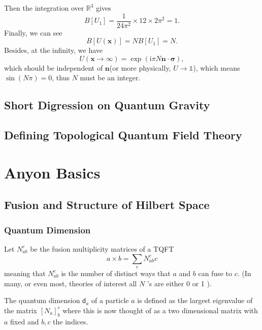 \documentclass{book}
\begin{document}
Then the integration over $\mathbb{R}^{3}$ gives
\begin{equation*}
B[ U_{1}] =\frac{1}{24\pi ^{2}} \times 12\times 2\pi ^{2} =1.
\end{equation*}
Finally, we can see
\begin{equation*}
B[ U(\boldsymbol{x})] =NB[ U_{1}] =N.
\end{equation*}
Besides, at the infinity, we have
\begin{equation*}
U(\boldsymbol{x}\rightarrow \infty )=\exp(\mathrm{i} \pi N\boldsymbol{n} \cdot \boldsymbol{\sigma }) ,
\end{equation*}
which should be independent of $\boldsymbol{n}$(or more physically, $U\rightarrow \mathds{1}$), which means $\sin( N\pi ) =0$, thus $N$ must be an integer. 

\chapter{Short Digression on Quantum Gravity}

\chapter{Defining Topological Quantum Field Theory}

\part{Anyon Basics}

\chapter{Fusion and Structure of Hilbert Space}

\section{Quantum Dimension}
Let $N_{ab}^{c}$ be the fusion multiplicity matrices of a TQFT
\begin{equation*}
a\times b=\sum _{c} N_{ab}^{c} c
\end{equation*}
meaning that $N_{ab}^{c}$ is the number of distinct ways that $a$ and $b$ can fuse to $c$. (In many, or even most, theories of interest all $N$ 's are either 0 or 1 ).



The quantum dimension $\mathsf{d}_{a}$ of a particle $a$ is defined as the largest eigenvalue of the matrix $[ N_{a}]_{b}^{c}$ where this is now thought of as a two dimensional matrix with $a$ fixed and $b,c$ the indices.
\end{document}
